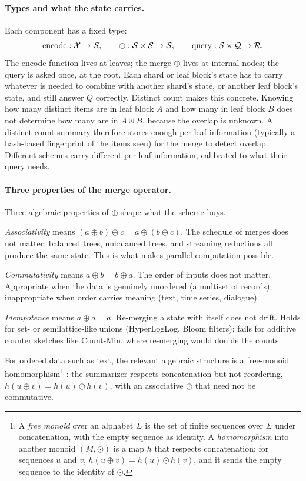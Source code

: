 \paragraph{Types and what the state carries.}
Each component has a fixed type:
\[
  \mathrm{encode}:\mathcal{X}\to\mathcal{S},\qquad
  \oplus:\mathcal{S}\times\mathcal{S}\to\mathcal{S},\qquad
  \mathrm{query}:\mathcal{S}\times\mathcal{Q}\to\mathcal{R}.
\]
The encode function lives at leaves; the merge \(\oplus\) lives at
internal nodes; the query is asked once, at the root. Each shard or
leaf block's state has to carry whatever is needed to combine with
another shard's state, or another leaf block's state, and still answer
\(Q\) correctly. Distinct count makes this concrete. Knowing how many
distinct items are in leaf block \(A\) and how many in leaf block \(B\)
does not determine how many are in \(A\uplus B\), because the overlap
is unknown. A distinct-count summary therefore stores enough per-leaf
information (typically a hash-based fingerprint of the items seen) for
the merge to detect overlap. Different schemes carry different per-leaf
information, calibrated to what their query needs.

\paragraph{Three properties of the merge operator.}
Three algebraic properties of \(\oplus\) shape what the scheme buys.

\emph{Associativity} means \((a\oplus b)\oplus c = a\oplus(b\oplus c)\).
The schedule of merges does not matter; balanced trees, unbalanced
trees, and streaming reductions all produce the same state. This is
what makes parallel computation possible.

\emph{Commutativity} means \(a\oplus b = b\oplus a\). The order of
inputs does not matter. Appropriate when the data is genuinely
unordered (a multiset of records); inappropriate when order carries
meaning (text, time series, dialogue).

\emph{Idempotence} means \(a\oplus a = a\). Re-merging a state with
itself does not drift. Holds for set- or semilattice-like unions
(HyperLogLog, Bloom filters); fails for additive counter sketches like
Count-Min, where re-merging would double the counts.

For ordered data such as text, the relevant algebraic structure is a
free-monoid homomorphism\footnote{A \emph{free monoid} over an alphabet
\(\Sigma\) is the set of finite sequences over \(\Sigma\) under
concatenation, with the empty sequence as identity. A
\emph{homomorphism} into another monoid \((M,\odot)\) is a map \(h\)
that respects concatenation: for sequences \(u\) and \(v\),
\(h(u\oplus v)=h(u)\odot h(v)\), and it sends the empty sequence to
the identity of \(\odot\).}
\citep{Gibbons1996ThirdHomomorphism}: the summarizer respects
concatenation but not reordering, \(h(u\oplus v)=h(u)\odot h(v)\),
with an associative \(\odot\) that need not be commutative.

